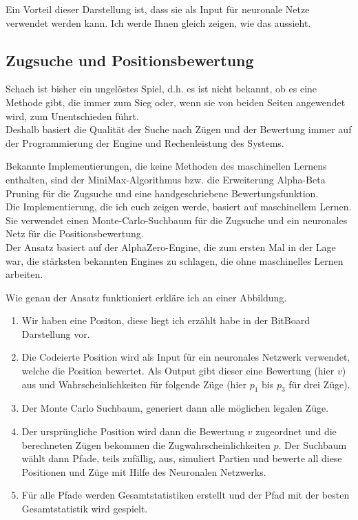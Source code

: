 Ein Vorteil dieser Darstellung ist, dass sie als Input für neuronale Netze verwendet werden kann. Ich werde Ihnen gleich zeigen, wie das aussieht.

\newpage

\subsection{Zugsuche und Positionsbewertung}

Schach ist bisher ein ungelöstes Spiel, d.h. es ist nicht bekannt, ob es eine Methode gibt, die immer zum Sieg oder, wenn sie von beiden Seiten angewendet wird, zum Unentschieden führt.\\

Deshalb basiert die Qualität der Suche nach Zügen und der Bewertung immer auf der Programmierung der Engine und Rechenleistung des Systems.

Bekannte Implementierungen, die keine Methoden des maschinellen Lernens enthalten, sind der MiniMax-Algorithmus bzw. die Erweiterung Alpha-Beta Pruning für die Zugsuche und eine handgeschriebene Bewertungsfunktion.\\

Die Implementierung, die ich euch zeigen werde, basiert auf maschinellem Lernen. Sie verwendet einen Monte-Carlo-Suchbaum für die Zugsuche und ein neuronales Netz für die Positionsbewertung.\\

Der Ansatz basiert auf der AlphaZero-Engine, die zum ersten Mal in der Lage war, die stärksten bekannten Engines zu schlagen, die ohne maschinelles Lernen arbeiten.

\newpage

Wie genau der Ansatz funktioniert erkläre ich an einer Abbildung.

\begin{enumerate}[leftmargin=*]
\item Wir haben eine Positon, diese liegt ich erzählt habe in der BitBoard Darstellung vor.
\item Die Codeierte Position wird als Input für ein neuronales Netzwerk verwendet, welche die Position bewertet. Als Output gibt dieser eine Bewertung (hier $v$) aus und Wahrscheinlichkeiten für folgende Züge (hier $p_1$ bis $p_3$ für drei Züge).
\item Der Monte Carlo Suchbaum, generiert dann alle möglichen legalen Züge.
\item Der ursprüngliche Position wird dann die Bewertung $v$ zugeordnet und die berechneten Zügen bekommen die Zugwahrscheinlichkeiten $p$. Der Suchbaum wählt dann Pfade, teils zufällig, aus, simuliert Partien und bewerte all diese Positionen und Züge mit Hilfe des Neuronalen Netzwerks.
\item Für alle Pfade werden Gesamtstatistiken erstellt und der Pfad mit der besten Gesamtstatistik wird gespielt.
\end{enumerate}

